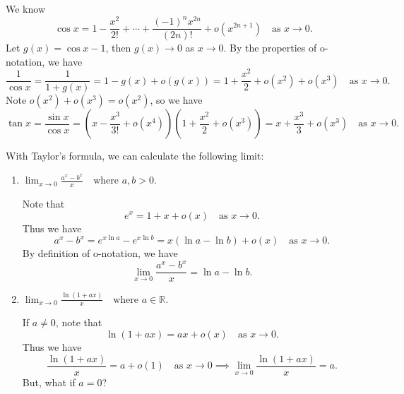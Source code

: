         \begin{exampleenv}
            We know 
            \[
            \cos x = 1 - \frac{x^2}{2!} + \cdots + \frac{(-1)^n x^{2n}}{(2n)!} + o(x^{2n+1}) \quad \text{as } x\to 0.
            \]
                Let $g(x) = \cos x -1$, then $g(x)\to 0$ as $x\to 0$. By the properties of o-notation, we have
                \[
                \frac{1}{\cos x} = \frac{1}{1 + g(x)} = 1 - g(x) + o(g(x)) = 1 +\frac{x^2}{2} + o(x^2) + o(x^3) \quad \text{as } x\to 0.
                \]
            Note $o(x^2)+o(x^3)=o(x^2)$, so we have
            \[
            \tan x = \frac{\sin x}{\cos x} = \left( x - \frac{x^3}{3!} + o(x^4) \right) \left( 1 + \frac{x^2}{2} + o(x^3) \right) = x + \frac{x^3}{3} + o(x^3) \quad \text{as } x\to 0.
            \]
        \end{exampleenv}
        \begin{exampleenv}
            With Taylor's formula, we can calculate the following limit:
            \begin{enumerate}
                \item \(\displaystyle
            \lim_{x\to 0} \frac{a^x - b^x}{x} \quad \text{where } a,b>0.
            \)

            Note that
            \[
            e^x = 1 + x + o(x) \quad \text{as } x\to 0.
            \]
            Thus we have
            \[
            a^x - b^x = e^{x\ln a} - e^{x\ln b} = x(\ln a - \ln b) + o(x) \quad \text{as } x\to 0.
            \]
            By definition of o-notation, we have
            \[
            \lim_{x\to 0} \frac{a^x - b^x}{x} = \ln a - \ln b.
            \]
                \item \(\displaystyle
            \lim_{x\to 0} \frac{\ln(1+ax)}{x} \quad \text{where } a\in \mathbb{R}.
            \)

            If $a\neq 0$, note that
            \[
            \ln(1+ax) = ax + o(x) \quad \text{as } x\to 0.
            \]
            Thus we have
            \[
            \frac{\ln(1+ax)}{x} = a + o(1) \quad \text{as } x\to 0 \implies \lim_{x\to 0} \frac{\ln(1+ax)}{x} = a.
            \]
            But, what if $a=0$? 
            \end{enumerate}
        \end{exampleenv}

